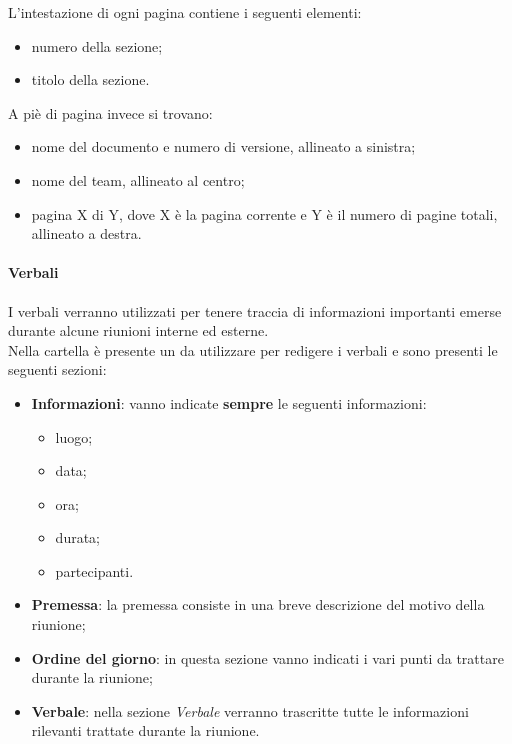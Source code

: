 		L'intestazione di ogni pagina contiene i seguenti elementi:
		\begin{itemize}
			\item numero della sezione;
			\item titolo della sezione.
		\end{itemize}
		A piè di pagina invece si trovano:
		\begin{itemize}
			\item nome del documento e numero di versione, allineato a sinistra;
			\item nome del team, allineato al centro;
			\item pagina X di Y, dove X è la pagina corrente e Y è il numero di pagine totali, allineato a destra.
		\end{itemize}
	
	\paragraph{Verbali}
	I verbali verranno utilizzati per tenere traccia di informazioni importanti emerse durante alcune riunioni interne ed esterne. \\
	Nella cartella  è presente un  da utilizzare per redigere i verbali e sono presenti le seguenti sezioni:
	\begin{itemize}
		\item \textbf{Informazioni}: vanno indicate \textbf{sempre} le seguenti informazioni:
		\begin{itemize}
			\item luogo;
			\item data;
			\item ora;
			\item durata;
			\item partecipanti.
		\end{itemize}
		\item \textbf{Premessa}: la premessa consiste in una breve descrizione del motivo della riunione;
		\item \textbf{Ordine del giorno}: in questa sezione vanno indicati i vari punti da trattare durante la riunione;
		\item \textbf{Verbale}: nella sezione \textit{Verbale} verranno trascritte tutte le informazioni rilevanti trattate durante la riunione.
	\end{itemize}	
